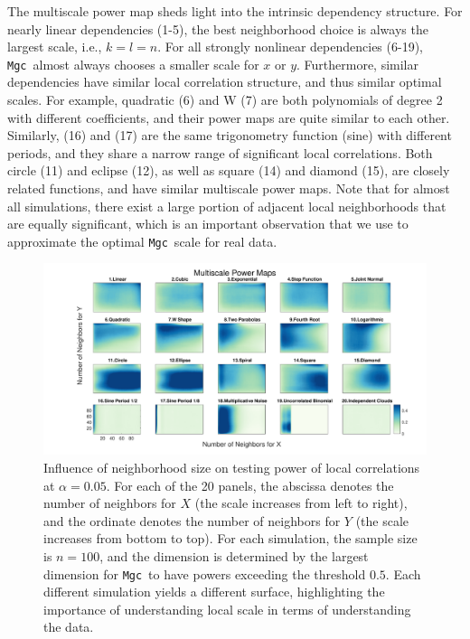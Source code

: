 \documentclass[11pt]{article}
\providecommand{\sct}[1]{{\sc \texttt{#1}}}
\newcommand{\Mgc}{\sct{Mgc}}
\begin{document}
The multiscale power map sheds light into the intrinsic dependency structure.
For nearly linear dependencies (1-5), the best neighborhood choice is always the largest scale, i.e., $k=l=n$. For all strongly nonlinear dependencies (6-19), \Mgc~almost always chooses a smaller scale for $x$ or $y$.
 Furthermore, similar dependencies have similar local correlation structure, and thus similar optimal scales. For example, quadratic (6) and W (7) are both polynomials of degree 2 with different coefficients, and their power maps are quite similar to each other. Similarly,  (16) and (17) are the same trigonometry function (sine) with different periods, and they share a narrow range of significant local correlations.
Both circle (11) and eclipse (12), as well as square (14) and diamond (15), are closely related functions, and have similar multiscale power maps.
Note that for almost all simulations, there exist a large portion of adjacent local neighborhoods that are equally significant, which is an important observation that we use to approximate the optimal \Mgc~scale for real data.

\begin{figure}[htbp]
\includegraphics[width=1.0\textwidth]{../Figures/FigHDHeat}
\caption{Influence of neighborhood size on testing power of local correlations at $\alpha=0.05$.
For each of the 20 panels, the abscissa denotes the number of neighbors for $X$ (the scale increases from left to right), and the ordinate denotes the number of neighbors for $Y$ (the scale increases from bottom to top). For each simulation, the sample size is $n=100$, and the dimension is determined by the largest dimension for \Mgc~to have powers exceeding the threshold $0.5$. Each different simulation yields a different surface, highlighting the importance of understanding local scale in terms of understanding the data. }
\label{f:powermaps}
\end{figure}
\end{document}
